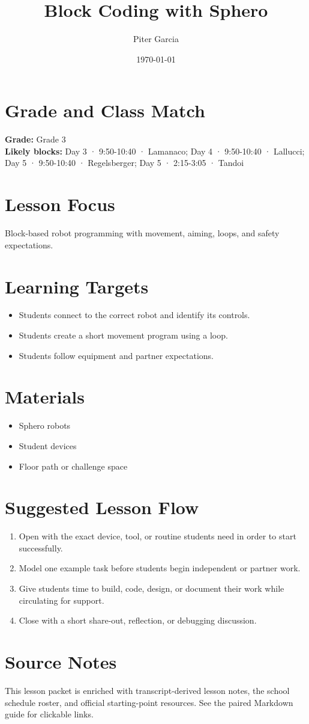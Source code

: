 \documentclass[11pt]{article}
\title{Block Coding with Sphero}
\author{Piter Garcia}
\date{\today}
\begin{document}
\maketitle

\section*{Grade and Class Match}
\textbf{Grade:} Grade 3\\
\textbf{Likely blocks:} Day 3 · 9:50-10:40 · Lamanaco; Day 4 · 9:50-10:40 · Lallucci; Day 5 · 9:50-10:40 · Regelsberger; Day 5 · 2:15-3:05 · Tandoi

\section*{Lesson Focus}
Block-based robot programming with movement, aiming, loops, and safety expectations.

\section*{Learning Targets}
\begin{itemize}[leftmargin=*]
\item Students connect to the correct robot and identify its controls.
\item Students create a short movement program using a loop.
\item Students follow equipment and partner expectations.
\end{itemize}

\section*{Materials}
\begin{itemize}[leftmargin=*]
\item Sphero robots
\item Student devices
\item Floor path or challenge space
\end{itemize}

\section*{Suggested Lesson Flow}
\begin{enumerate}[leftmargin=*]
\item Open with the exact device, tool, or routine students need in order to start successfully.
\item Model one example task before students begin independent or partner work.
\item Give students time to build, code, design, or document their work while circulating for support.
\item Close with a short share-out, reflection, or debugging discussion.
\end{enumerate}

\section*{Source Notes}
This lesson packet is enriched with transcript-derived lesson notes, the school schedule roster, and official starting-point resources. See the paired Markdown guide for clickable links.



\end{document}
